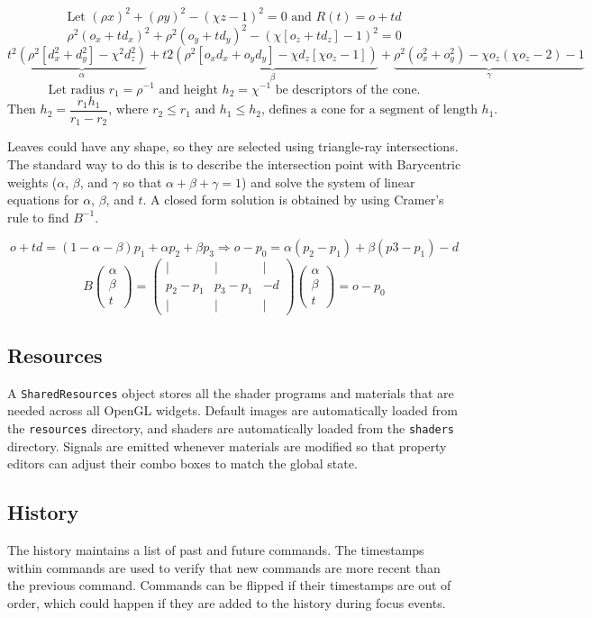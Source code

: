 \documentclass[10pt]{article}
\newcommand\m[1]{\begin{pmatrix}#1\end{pmatrix}}
\begin{document}
\[ \text{Let } (\rho x)^2 + (\rho y)^2 - (\chi z - 1)^2 = 0 \text{ and } R(t) = o + td \]
\[ \rho^2(o_x + td_x)^2 + \rho^2(o_y + td_y)^2 - (\chi[o_z + td_z] - 1)^2 = 0 \]
\[ t^2\underbrace{\left(\rho^2[d_x^2 + d_y^2] - \chi^2d_z^2\right)}_{\alpha} +
t\underbrace{2\left(\rho^2[o_xd_x + o_yd_y] - \chi d_z[\chi o_z-1]\right)}_{\beta} +
\underbrace{\rho^2\left(o_x^2 + o_y^2\right) - \chi o_z\left(\chi o_z-2\right) - 1}_{\gamma} \]
\[ \text{Let radius } r_1 = \rho^{-1} \text{ and height } h_2 = \chi^{-1} \text{ be descriptors of the cone.} \]
\[ \text{Then } h_2 = \frac{r_1h_1}{r_1-r_2} \text{, where } r_2 \le r_1 \text{ and } h_1 \le h_2 \text{, defines a cone for a segment of length } h_1 \text{.} \]

Leaves could have any shape, so they are selected using triangle-ray intersections. The standard way to do this is to describe the intersection point with Barycentric weights ($ \alpha $, $ \beta $, and $ \gamma $ so that $ \alpha + \beta + \gamma = 1 $) and solve the system of linear equations for $ \alpha $, $ \beta $, and $ t $. A closed form solution is obtained by using Cramer's rule to find $ B^{-1} $.

\[ o + td = (1 - \alpha - \beta) p_1 + \alpha p_2 + \beta p_3 \Rightarrow o - p_0 = \alpha(p_2 - p_1) + \beta(p3 - p_1) - d \]
\[ B \m{\alpha \\ \beta \\ t} = \m{|&|&|\\ p_2 - p_1 & p_3 - p_1 & -d \\|&|&|} \m{\alpha \\ \beta \\ t} = o - p_0 \]

\subsection{Resources}
A \texttt{SharedResources} object stores all the shader programs and materials that are needed across all OpenGL widgets. Default images are automatically loaded from the \texttt{resources} directory, and shaders are automatically loaded from the \texttt{shaders} directory. Signals are emitted whenever materials are modified so that property editors can adjust their combo boxes to match the global state.

\subsection{History}
The history maintains a list of past and future commands. The timestamps within commands are used to verify that new commands are more recent than the previous command. Commands can be flipped if their timestamps are out of order, which could happen if they are added to the history during focus events.
\end{document}
